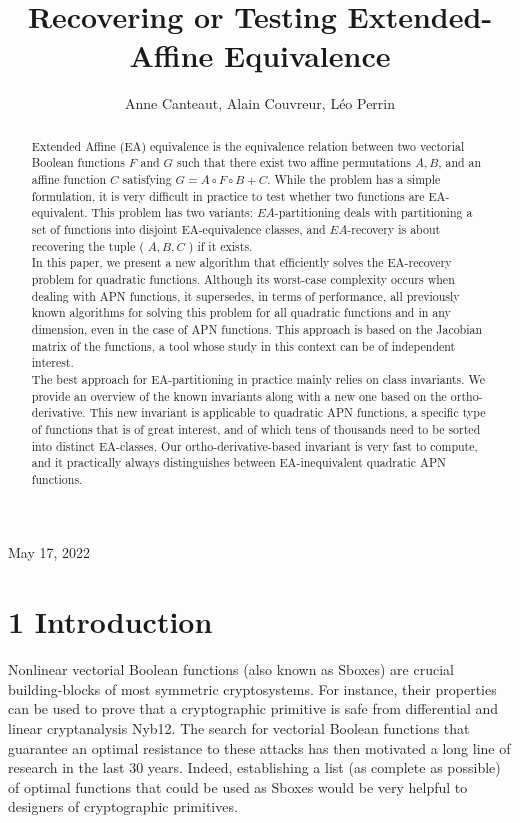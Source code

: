 \documentclass[10pt]{article}
\title{Recovering or Testing Extended-Affine Equivalence }
\author{Anne Canteaut, Alain Couvreur, Léo Perrin}
\date{}
\begin{document}
\maketitle
\captionsetup{singlelinecheck=false}
May 17, 2022

\begin{abstract}
Extended Affine (EA) equivalence is the equivalence relation between two vectorial Boolean functions $F$ and $G$ such that there exist two affine permutations $A, B$, and an affine function $C$ satisfying $G=A \circ F \circ B+C$. While the problem has a simple formulation, it is very difficult in practice to test whether two functions are EA-equivalent. This problem has two variants: $E A$-partitioning deals with partitioning a set of functions into disjoint EA-equivalence classes, and $E A$-recovery is about recovering the tuple ( $A, B, C$ ) if it exists.\\
In this paper, we present a new algorithm that efficiently solves the EA-recovery problem for quadratic functions. Although its worst-case complexity occurs when dealing with APN functions, it supersedes, in terms of performance, all previously known algorithms for solving this problem for all quadratic functions and in any dimension, even in the case of APN functions. This approach is based on the Jacobian matrix of the functions, a tool whose study in this context can be of independent interest.\\
The best approach for EA-partitioning in practice mainly relies on class invariants. We provide an overview of the known invariants along with a new one based on the ortho-derivative. This new invariant is applicable to quadratic APN functions, a specific type of functions that is of great interest, and of which tens of thousands need to be sorted into distinct EA-classes. Our ortho-derivative-based invariant is very fast to compute, and it practically always distinguishes between EA-inequivalent quadratic APN functions.
\end{abstract}

\section*{1 Introduction}
Nonlinear vectorial Boolean functions (also known as Sboxes) are crucial building-blocks of most symmetric cryptosystems. For instance, their properties can be used to prove that a cryptographic primitive is safe from differential and linear cryptanalysis Nyb12. The search for vectorial Boolean functions that guarantee an optimal resistance to these attacks has then motivated a long line of research in the last 30 years. Indeed, establishing a list (as complete as possible) of optimal functions that could be used as Sboxes would be very helpful to designers of cryptographic primitives.
\end{document}
